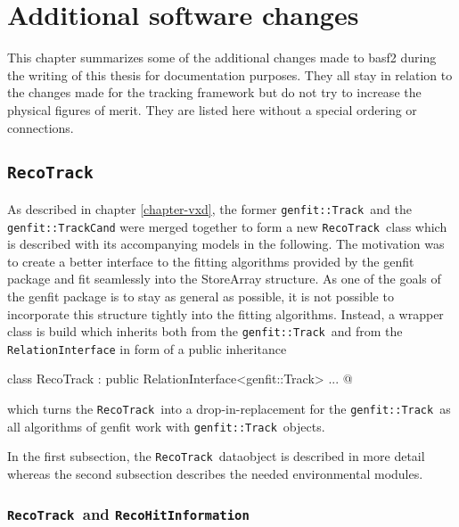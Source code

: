 \newcommand{\RecoTrack}{\texttt{RecoTrack}\ }
\newcommand{\Track}{\texttt{genfit::Track}\ }
\newcommand{\Hit}{\texttt{RecoHitInformation}\ }
\chapter{Additional software changes} \label{chapter-addon}

This chapter summarizes some of the additional changes made to basf2 during the writing of this thesis for documentation purposes. They all stay in relation to the changes made for the tracking framework but do not try to increase the physical figures of merit. They are listed here without a special ordering or connections.

\section{\texttt{RecoTrack}}
As described in chapter \ref{chapter-vxd}, the former \Track and the \texttt{genfit::TrackCand} were merged together to form a new \RecoTrack class which is described with its accompanying models in the following. The motivation was to create a better interface to the fitting algorithms provided by the genfit package and fit seamlessly into the StoreArray structure. As one of the goals of the genfit package is to stay as general as possible, it is not possible to incorporate this structure tightly into the fitting algorithms. Instead, a wrapper class is build which inherits both from the \Track and from the \texttt{RelationInterface} in form of a public inheritance 
\begin{center}
  \lstset{escapechar=@,style=customC}
  \lstinline@ class RecoTrack : public RelationInterface<genfit::Track> { ... }@
\end{center}
which turns the \RecoTrack into a drop-in-replacement for the \Track as all algorithms of genfit work with \Track objects. 

In the first subsection, the \RecoTrack dataobject is described in more detail whereas the second subsection describes the needed environmental modules.

\subsection{\RecoTrack and \Hit}

